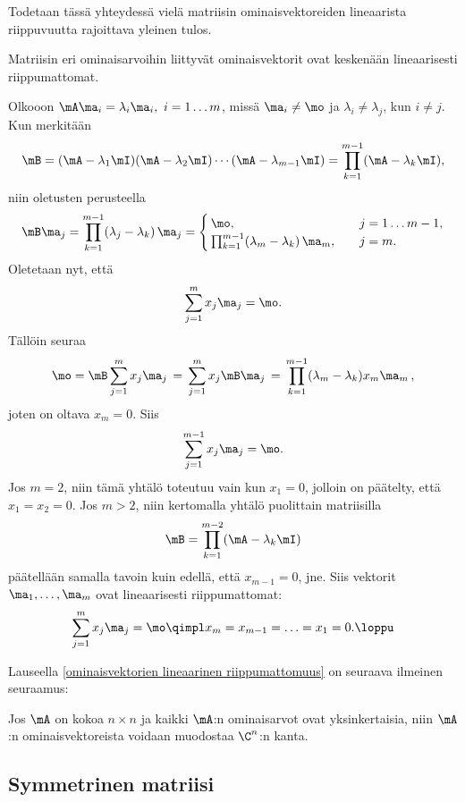 Todetaan tässä yhteydessä vielä matriisin ominaisvektoreiden lineaarista riippuvuutta
rajoittava yleinen tulos.
\begin{Lause} \label{ominaisvektorien lineaarinen riippumattomuus}
 Matriisin eri ominaisarvoihin liittyvät ominaisvektorit
ovat keskenään lineaarisesti riippumattomat.
\end{Lause}
\tod Olkooon $\mA\ma_i=\lambda_i\ma_i,\ i=1 \ldots m$, missä $\ma_i\neq\mo$ ja 
$\lambda_i\neq\lambda_j$, kun $i \neq j$. Kun merkitään
\[
\mB=(\mA-\lambda_1\mI)(\mA-\lambda_2\mI) \cdots (\mA-\lambda_{m-1}\mI) 
   = \prod_{k=1}^{m-1}(\mA-\lambda_k\mI),
\]
niin oletusten perusteella
\[
\mB\ma_j = \prod_{k=1}^{m-1}(\lambda_j-\lambda_k)\,\ma_j 
         = \begin{cases} 
            \,\mo, \quad &j=1 \ldots m-1, \\ 
            \,\prod_{k=1}^{m-1}(\lambda_m-\lambda_k)\,\ma_m, \quad &j=m. 
           \end{cases} 
\]
Oletetaan nyt, että
\[
\sum_{j=1}^m x_j\ma_j = \mo.
\]
Tällöin seuraa
\[
\mo=\mB\sum_{j=1}^m x_j\ma_j\,=\,\sum_{j=1}^m x_j\mB\ma_j\,
                              =\,\prod_{k=1}^{m-1}(\lambda_m-\lambda_k)x_m\ma_m\,,
\]
joten on oltava $x_m=0$. Siis
\[
\sum_{j=1}^{m-1} x_j\ma_j = \mo.
\]
Jos $m=2$, niin tämä yhtälö toteutuu vain kun $x_1=0$, jolloin on päätelty, että $x_1=x_2=0$.
Jos $m>2$, niin kertomalla yhtälö puolittain matriisilla
\[
\mB=\prod_{k=1}^{m-2}(\mA-\lambda_k\mI)
\]
päätellään samalla tavoin kuin edellä, että $x_{m-1}=0$, jne. Siis vektorit 
$\ma_1, \ldots, \ma_m$ ovat lineaarisesti riippumattomat:
\[
\sum_{j=1}^m x_j\ma_j = \mo \qimpl x_m = x_{m-1} = \ldots = x_1 = 0. \loppu
\]

Lauseella \ref{ominaisvektorien lineaarinen riippumattomuus} on seuraava ilmeinen seuraamus:
\begin{Kor} Jos $\mA$ on kokoa $n\times n$ ja kaikki $\mA$:n ominaisarvot ovat yksinkertaisia,
niin $\mA$:n ominaisvektoreista voidaan muodostaa $\C^n$:n kanta.
\end{Kor}

\subsection{Symmetrinen matriisi}

